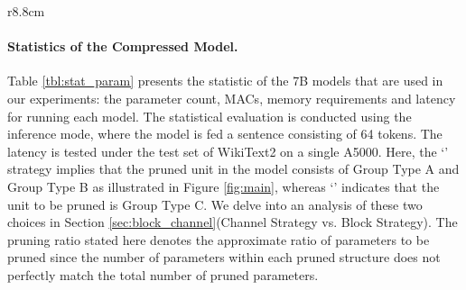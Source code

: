 \begin{wraptable}{r}{8.8cm}
\vspace{-3mm}
\caption{Statistics of the base model and the compressed model. }\label{tbl:stat_param}
\vspace{-3mm}
\end{wraptable}
\vspace{-1mm}
\paragraph{Statistics of the Compressed Model.} 
Table \ref{tbl:stat_param} presents the statistic of the 7B models that are used in our experiments: the parameter count, MACs, memory requirements and latency for running each model. The statistical evaluation is conducted using the inference mode, where the model is fed a sentence consisting of 64 tokens. The latency is tested under the test set of WikiText2 on a single A5000.
Here, the `\blockname' strategy implies that the pruned unit in the model consists of Group Type A and Group Type B as illustrated in Figure \ref{fig:main}, whereas `\channelname' indicates that the unit to be pruned is Group Type C. We delve into an analysis of these two choices in Section \ref{sec:block_channel}(Channel Strategy vs. Block Strategy). The pruning ratio stated here denotes the approximate ratio of parameters to be pruned since the number of parameters within each pruned structure does not perfectly match the total number of pruned parameters.

